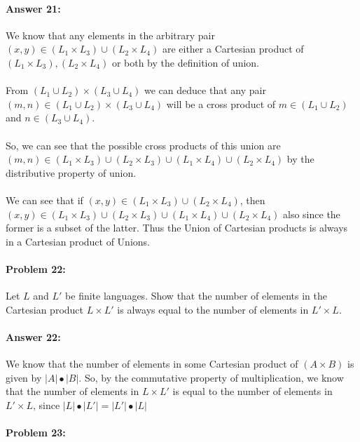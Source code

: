 \documentclass[10pt]{article}
\begin{document}
\paragraph{Answer 21:} 
We know that any elements in the arbitrary pair $(x, y) \in (L_1 \times L_3) \cup (L_2 \times L_4)$ are either a Cartesian product of $(L_1 \times L_3) , (L_2 \times L_4)$ or both by the definition of union.
\\

\\
From $(L_1 \cup L_2) \times (L_3 \cup L_4)$ we can deduce that any pair $(m,n) \in (L_1 \cup L_2) \times (L_3 \cup L_4)$ will be a cross product of $m \in (L_1 \cup L_2)$ and $n \in (L_3 \cup L_4)$. 
\\
\\
So, we can see that the possible cross products of this union are $(m, n) \in (L_1 \times L_3) \cup (L_2 \times L_3) \cup (L_1 \times L_4) \cup (L_2 \times L_4)$ by the distributive property of union.
\\
\\
We can see that if $(x,y) \in (L_1 \times L_3) \cup (L_2 \times L_4)$, then $(x, y) \in (L_1 \times L_3) \cup (L_2 \times L_3) \cup (L_1 \times L_4) \cup (L_2 \times L_4)$ also since the former is a subset of the latter. Thus the Union of Cartesian products is always in a Cartesian product of Unions.

\hrulefill
\paragraph{Problem 22:}
Let $L$ and $L'$ be finite languages. Show that the number of elements
in the Cartesian product $L \times L'$ is always equal to the number
of elements in $L' \times L$.

\paragraph{Answer 22:} We know that the number of elements in some Cartesian product of $(A \times B)$ is given by $|A| \bullet |B|$. So, by the commutative property of multiplication, we know that the number of elements in $L \times L'$ is equal to the number of elements in $L' \times L$, since $|L| \bullet |L'| = |L'| \bullet |L|$

\hrulefill
\paragraph{Problem 23:}
\end{document}
